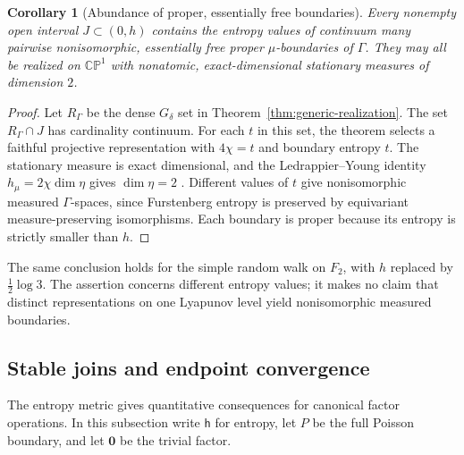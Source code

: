 \documentclass[11pt,letterpaper]{amsart}
\newtheorem{corollary}[theorem]{Corollary}
\theoremstyle{definition}
\theoremstyle{remark}
\numberwithin{equation}{section}
\begin{document}
\begin{corollary}[Abundance of proper, essentially free boundaries]
\label{cor:continuum-proper-boundaries}
Every nonempty open interval $J\subset(0,h)$ contains the entropy
values of continuum many pairwise nonisomorphic, essentially free
proper $\mu$-boundaries of $\Gamma$. They may all be realized on
$\mathbb{CP}^1$ with nonatomic, exact-dimensional stationary measures
of dimension $2$.
\end{corollary}
\begin{proof}
Let $R_\Gamma$ be the dense $G_\delta$ set in
Theorem~\ref{thm:generic-realization}. The set $R_\Gamma\cap J$ has
cardinality continuum. For each $t$ in this set, the theorem selects
a faithful projective representation with $4\chi=t$ and boundary
entropy $t$. The stationary measure is exact dimensional, and the
Ledrappier--Young identity
$h_\mu=2\chi\dim\eta$ gives $\dim\eta=2$
\cite[Theorem~2.14 and Appendix~A]{RR}.
Different values of $t$ give nonisomorphic measured $\Gamma$-spaces,
since Furstenberg entropy is preserved by equivariant
measure-preserving isomorphisms. Each boundary is proper because
its entropy is strictly smaller than $h$.
\end{proof}

The same conclusion holds for the simple random walk on $F_2$, with
$h$ replaced by $\frac12\log3$. The assertion concerns different
entropy values; it makes no claim that distinct representations on
one Lyapunov level yield nonisomorphic measured boundaries.

\subsection{Stable joins and endpoint convergence}

The entropy metric gives quantitative consequences for canonical factor
operations. In this subsection write $\mathsf h$ for entropy, let
$P$ be the full Poisson boundary, and let $\mathbf0$ be the trivial factor.
\end{document}
